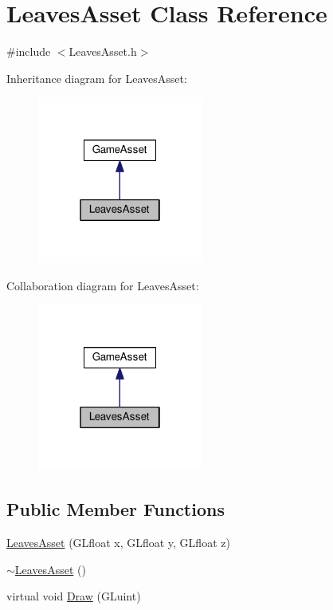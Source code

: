 \hypertarget{classLeavesAsset}{}\section{Leaves\+Asset Class Reference}
\label{classLeavesAsset}


{\ttfamily \#include $<$Leaves\+Asset.\+h$>$}



Inheritance diagram for Leaves\+Asset\+:\nopagebreak
\begin{figure}[H]
\begin{center}
\leavevmode
\includegraphics[width=154pt]{classLeavesAsset__inherit__graph}
\end{center}
\end{figure}


Collaboration diagram for Leaves\+Asset\+:\nopagebreak
\begin{figure}[H]
\begin{center}
\leavevmode
\includegraphics[width=154pt]{classLeavesAsset__coll__graph}
\end{center}
\end{figure}
\subsection*{Public Member Functions}
\begin{DoxyCompactItemize}
\item 
\hyperlink{classLeavesAsset_a1fb1212e5399f16071f0be7ff42cc344}{Leaves\+Asset} (G\+Lfloat x, G\+Lfloat y, G\+Lfloat z)
\item 
\hyperlink{classLeavesAsset_ae98d43a307f4c75cc8a661f0b36a213a}{$\sim$\+Leaves\+Asset} ()
\item 
virtual void \hyperlink{classLeavesAsset_a807fd196b83e5adb131d489ef6645742}{Draw} (G\+Luint)
\end{DoxyCompactItemize}


